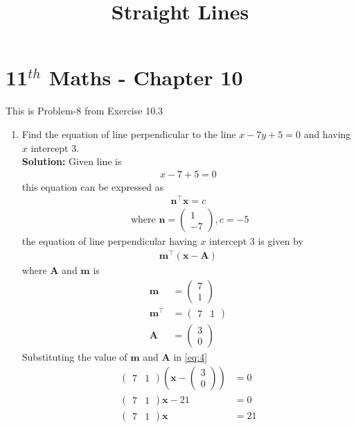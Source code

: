 \documentclass[12pt]{article}
\providecommand{\brak}[1]{\ensuremath{\left(#1\right)}}
\newcommand{\solution}{\noindent \textbf{Solution: }}
\newcommand{\myvec}[1]{\ensuremath{\begin{pmatrix}#1\end{pmatrix}}}
\let\vec\mathbf
\begin{document}
\begin{center}
\title{\textbf{Straight Lines}}
\date{\vspace{-5ex}} %
\maketitle
\end{center}
\setcounter{page}{1}
\section*{11$^{th}$ Maths - Chapter 10}
This is Problem-8 from Exercise 10.3
\begin{enumerate}
	\item Find the equation of line perpendicular to the line $x-7y+5=0$ and having $x$ intercept $3$.\\
\solution
Given line is 
\begin{align}
	x-7+5=0
\end{align}
this equation can be expressed as 
\begin{align}
	\vec{n}^{\top}\vec{x}=c
\end{align}
\begin{align}
	\text{ where }
		\vec{n} = \myvec{1\\-7} , c = -5
\end{align}
the equation of line perpendicular having $x$ intercept $3$ is given by 
\begin{align}
	\vec{m}^\top\brak{\vec{x}-\vec{A}} \label{eq:4}
\end{align}
		where $\vec{A}$ and $\vec{m}$ is 
\begin{align}
	\vec{m} &=\myvec{7\\1}\\
	\vec{m}^\top &=\myvec{7 & 1}\\
	\vec{A} &=\myvec{3\\0}
\end{align}
		Substituting the value of $\vec{m}$ and $\vec{A}$ in \eqref{eq:4}
		\begin{align}
			\myvec{7 & 1}\brak{\vec{x}-\myvec{3\\0}} &=0\\
			\myvec{7 & 1}\vec{x}-21 &=0\\
			\myvec{7 & 1}\vec{x} &= 21
		\end{align}
\begin{figure}[!h]
\begin{center}

\end{center}
\end{figure}
\end{enumerate}
\end{document}
